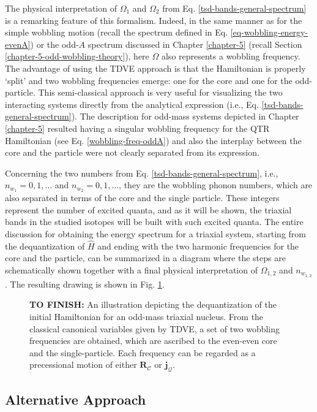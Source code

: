 The physical interpretation of $\Omega_1$ and $\Omega_2$ from Eq. \ref{tsd-bands-general-spectrum} is a remarking feature of this formalism. Indeed, in the same manner as for the simple wobbling motion (recall the spectrum defined in Eq. \ref{eq-wobbling-energy-evenA}) or the odd-$A$ spectrum discussed in Chapter \ref{chapter-5} (recall Section \ref{chapter-5-odd-wobbling-theory}), here $\Omega$ also represents a wobbling frequency. The advantage of using the TDVE approach is that the Hamiltonian is properly `split' and two wobbling frequencies emerge: one for the core and one for the odd-particle. This semi-classical approach is very useful for visualizing the two interacting systems directly from the analytical expression (i.e., Eq. \ref{tsd-bands-general-spectrum}). The description for odd-mass systems depicted in Chapter \ref{chapter-5} resulted having a singular wobbling frequency for the QTR Hamiltonian (see Eq. \ref{wobbling-freq-oddA}) and also the interplay between the core and the particle were not clearly separated from its expression.

Concerning the two numbers from Eq. \ref{tsd-bands-general-spectrum}, i.e., $n_{w_1}=0,1,\dots$ and $n_{w_2}=0,1,\dots$, they are the wobbling phonon numbers, which are also separated in terms of the core and the single particle. These integers represent the number of excited quanta, and as it will be shown, the triaxial bands in the studied isotopes will be built with such excited quanta. The entire discussion for obtaining the energy spectrum for a triaxial system, starting from the dequantization of $\hat{H}$ and ending with the two harmonic frequencies for the core and the particle, can be summarized in a diagram where the steps are schematically shown together with a final physical interpretation of $\Omega_{1,2}$ and $n_{w_{1,2}}$. The resulting drawing is shown in Fig. \ref{TDVE-wobbling-complete-sketch}.
\begin{figure}
    \centering
    \caption{\textbf{TO FINISH: }An illustration depicting the dequantization of the initial Hamiltonian for an odd-mass triaxial nucleus. From the classical canonical variables given by TDVE, a set of two wobbling frequencies are obtained, which are ascribed to the even-even core and the single-particle. Each frequency can be regarded as a precessional motion of either $\mathbf{R}_\mathscr{C}$ or $\mathbf{j}_\mathcal{Q}$.}
    \label{TDVE-wobbling-complete-sketch}
\end{figure}

\subsection{Alternative Approach}

